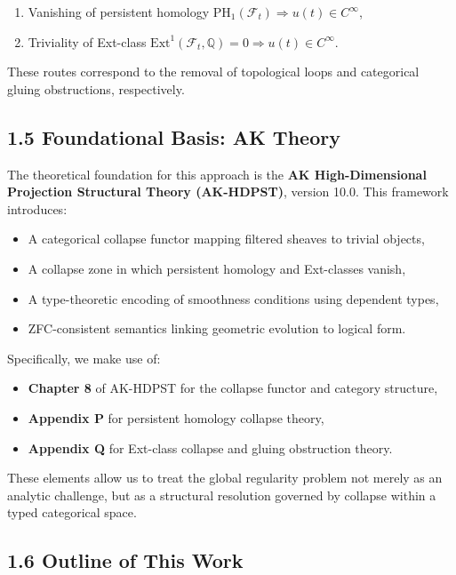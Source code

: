 \documentclass[11pt]{article}
\begin{document}
\begin{enumerate}
  \item Vanishing of persistent homology \( \mathrm{PH}_1(\mathcal{F}_t) \Rightarrow u(t) \in C^\infty \),
  \item Triviality of Ext-class \( \mathrm{Ext}^1(\mathcal{F}_t, \mathbb{Q}) = 0 \Rightarrow u(t) \in C^\infty \).
\end{enumerate}

These routes correspond to the removal of topological loops and categorical gluing obstructions, respectively.

\subsection{1.5 Foundational Basis: AK Theory}

The theoretical foundation for this approach is the \textbf{AK High-Dimensional Projection Structural Theory (AK-HDPST)}, version 10.0. This framework introduces:

\begin{itemize}
  \item A categorical collapse functor mapping filtered sheaves to trivial objects,
  \item A collapse zone in which persistent homology and Ext-classes vanish,
  \item A type-theoretic encoding of smoothness conditions using dependent types,
  \item ZFC-consistent semantics linking geometric evolution to logical form.
\end{itemize}

Specifically, we make use of:

\begin{itemize}
  \item \textbf{Chapter 8} of AK-HDPST for the collapse functor and category structure,
  \item \textbf{Appendix P} for persistent homology collapse theory,
  \item \textbf{Appendix Q} for Ext-class collapse and gluing obstruction theory.
\end{itemize}

These elements allow us to treat the global regularity problem not merely as an analytic challenge, but as a structural resolution governed by collapse within a typed categorical space.

\subsection{1.6 Outline of This Work}
\end{document}
